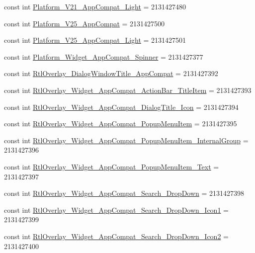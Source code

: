 \begin{CompactItemize}
\item 
const int \hyperlink{class__2doo_1_1_droid_1_1_resource_1_1_style_6134b543a199d45e558cff0f004bbc2e}{Platform\_\-V21\_\-AppCompat\_\-Light} = 2131427480
\item 
const int \hyperlink{class__2doo_1_1_droid_1_1_resource_1_1_style_f47b986a801722813b3998552cdd1904}{Platform\_\-V25\_\-AppCompat} = 2131427500
\item 
const int \hyperlink{class__2doo_1_1_droid_1_1_resource_1_1_style_c3af409f11ddf43337dc8c21cf965767}{Platform\_\-V25\_\-AppCompat\_\-Light} = 2131427501
\item 
const int \hyperlink{class__2doo_1_1_droid_1_1_resource_1_1_style_4200a9f69bfe045eb5cd267cc5a1c59c}{Platform\_\-Widget\_\-AppCompat\_\-Spinner} = 2131427377
\item 
const int \hyperlink{class__2doo_1_1_droid_1_1_resource_1_1_style_3b1b0b1f40832ed8ca18b84418203ed2}{RtlOverlay\_\-DialogWindowTitle\_\-AppCompat} = 2131427392
\item 
const int \hyperlink{class__2doo_1_1_droid_1_1_resource_1_1_style_aa069772a02720cabc05d967496ebd15}{RtlOverlay\_\-Widget\_\-AppCompat\_\-ActionBar\_\-TitleItem} = 2131427393
\item 
const int \hyperlink{class__2doo_1_1_droid_1_1_resource_1_1_style_0a2b36751a5eb9f54478c71ead75572a}{RtlOverlay\_\-Widget\_\-AppCompat\_\-DialogTitle\_\-Icon} = 2131427394
\item 
const int \hyperlink{class__2doo_1_1_droid_1_1_resource_1_1_style_da655e4fd5a85129f3883c79ba425a75}{RtlOverlay\_\-Widget\_\-AppCompat\_\-PopupMenuItem} = 2131427395
\item 
const int \hyperlink{class__2doo_1_1_droid_1_1_resource_1_1_style_510fc5a647308a0329dc38b9c2799395}{RtlOverlay\_\-Widget\_\-AppCompat\_\-PopupMenuItem\_\-InternalGroup} = 2131427396
\item 
const int \hyperlink{class__2doo_1_1_droid_1_1_resource_1_1_style_2207da8f6d733aedaed5ca95473f56cd}{RtlOverlay\_\-Widget\_\-AppCompat\_\-PopupMenuItem\_\-Text} = 2131427397
\item 
const int \hyperlink{class__2doo_1_1_droid_1_1_resource_1_1_style_135c696c68f465d980a370b8b6038ac1}{RtlOverlay\_\-Widget\_\-AppCompat\_\-Search\_\-DropDown} = 2131427398
\item 
const int \hyperlink{class__2doo_1_1_droid_1_1_resource_1_1_style_1f8cb6b95501bcf1b7f970661cf3dfa2}{RtlOverlay\_\-Widget\_\-AppCompat\_\-Search\_\-DropDown\_\-Icon1} = 2131427399
\item 
const int \hyperlink{class__2doo_1_1_droid_1_1_resource_1_1_style_e05986ee0a9fbceaf84780e1bb872bf6}{RtlOverlay\_\-Widget\_\-AppCompat\_\-Search\_\-DropDown\_\-Icon2} = 2131427400

\end{CompactItemize}
